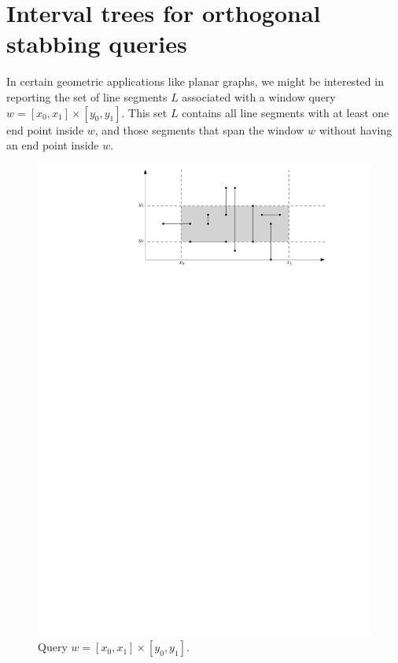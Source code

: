 \section{Interval trees for orthogonal stabbing queries}
\label{sec:interval-trees}

In certain geometric applications like planar graphs, we might be interested in reporting the set of line segments $L$ associated with a window query  $w = [x_0, x_1] \times [y_0, y_1]$. 
%
This set $L$ contains all line segments with at least one end point inside $w$, and those segments that span the window $w$ without having an end point inside $w$. 

\begin{figure}[ht!]
\centering
\includegraphics[scale=.8]{ipe/window-query.pdf}
\caption{Query $w = [x_0 , x_1] \times [y_0, y_1]$. }
\label{fig:stabbing-line}
\end{figure}



